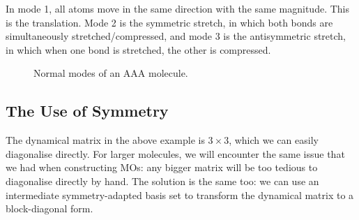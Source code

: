 \documentclass{article}
\theoremstyle{plain}\theoremheaderfont{\normalfont\itshape}\theorembodyfont{\rmfamily}\theoremseparator{.}\newtheorem*{rem}{Remark}\newtheorem*{ex}{Example}\newtheorem*{proof}{Proof}\newtheorem*{altp}{Alternative proof}
\theoremstyle{plain}\theoremheaderfont{\normalfont\bfseries}\theorembodyfont{\rmfamily}\theoremseparator{.}\newtheorem{thm}{Theorem}[section]\newtheorem{lem}[thm]{Lemma}\newtheorem{prop}[thm]{Proposition}\newtheorem*{cor}{Corollary}\newtheorem{defn}[thm]{Definition}\newtheorem{clm}[thm]{Claim}\newtheorem{clminproof}{Claim}
\theoremstyle{break}\theoremheaderfont{\normalfont\itshape}\theorembodyfont{\rmfamily}\theoremseparator{.\medskip}\newtheorem*{proofskip}{Proof}\newtheorem*{exs}{Examples}\newtheorem*{rems}{Remarks}
\theoremstyle{break}\theoremheaderfont{\normalfont\bfseries}\theorembodyfont{\rmfamily}\theoremseparator{.\medskip}\newtheorem{lemskip}[thm]{Lemma}\newtheorem{defnskip}[thm]{Definition}\newtheorem{propskip}[thm]{Proposition}\newtheorem{thmskip}[thm]{Theorem}
\numberwithin{equation}{section}
\begin{document}
    In mode 1, all atoms move in the same direction with the same magnitude. This is the translation. Mode 2 is the symmetric stretch, in which both bonds are simultaneously stretched/compressed, and mode 3 is the antisymmetric stretch, in which when one bond is stretched, the other is compressed.
    \begin{figure}[ht!]
        \centering
        \caption{Normal modes of an AAA molecule.}
    \end{figure}

    \subsection{The Use of Symmetry}
    The dynamical matrix in the above example is \(3\times 3\), which we can easily diagonalise directly. For larger molecules, we will encounter the same issue that we had when constructing MOs: any bigger matrix will be too tedious to diagonalise directly by hand. The solution is the same too: we can use an intermediate symmetry-adapted basis set to transform the dynamical matrix to a block-diagonal form.
\end{document}
